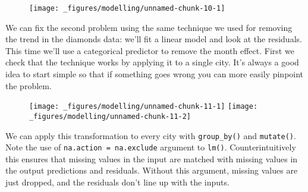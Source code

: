 \begin{figure}[H]
  \texttt{[image: \_figures/modelling/unnamed-chunk-10-1]}
\end{figure}

We can fix the second problem using the same technique we used for
removing the trend in the diamonds data: we'll fit a linear model and
look at the residuals. This time we'll use a categorical predictor to
remove the month effect. First we check that the technique works by
applying it to a single city. It's always a good idea to start simple so
that if something goes wrong you can more easily pinpoint the problem.

\begin{Shaded}
\end{Shaded}

\begin{figure}[H]
  \texttt{[image: \_figures/modelling/unnamed-chunk-11-1]}%
  \texttt{[image: \_figures/modelling/unnamed-chunk-11-2]}
\end{figure}

We can apply this transformation to every city with \texttt{group\_by()}
and \texttt{mutate()}. Note the use of \texttt{na.action\ =\ na.exclude}
argument to \texttt{lm()}. Counterintuitively this ensures that missing
values in the input are matched with missing values in the output
predictions and residuals. Without this argument, missing values are
just dropped, and the residuals don't line up with the inputs.

\begin{Shaded}
\end{Shaded}

